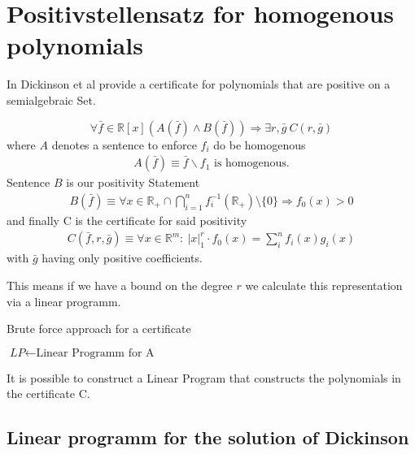 \documentclass[./main.tex]{subfiles}
\begin{document}
\section{Positivstellensatz for homogenous polynomials}
\label{secDick}
In \cite{dickinson2015extension} Dickinson et al  provide a certificate for polynomials that are positive on a semialgebraic Set.
\begin{thm}
\label{Dickinson}
\begin{equation}
\forall \bar{f} \in \mathbb{R}[x] \left( A(\bar{f}) \wedge B(\bar{f}) \right) \Rightarrow \exists r, \bar{g} \  C(r,\bar{g})
\end{equation}
where $A$ denotes a sentence to enforce $f_i$ do be homogenous
\begin{align*}
A(\bar{f}) \equiv \bar f \backslash f_1 \text{ is homogenous}.
\end{align*}
Sentence $B$ is our positivity Statement
\begin{align*}
B(\bar f ) \equiv \forall x \in \mathbb{R}_+\cap \bigcap_{i=1}^n f_i^{-1}(\mathbb R_+) \setminus \lbrace 0 \rbrace \Rightarrow f_0(x) >0 
\end{align*}
and finally C is the certificate for said positivity
\begin{align*}
C(\bar f ,r, \bar g) \equiv \forall x \in \mathbb{R}^m : \ \vert x \vert_1^r \cdot f_0(x) = \sum_i^n f_i(x)g_i(x) 
\end{align*}
with $\bar g$ having only positive coefficients.
\end{thm}


This means if we have a bound on the degree $r$ we calculate this representation via a linear programm.

\begin{algorithm}
\caption{Brute force approach for a certificate}\label{euclid}
\begin{algorithmic}[1]
\State $\textit{LP} \gets \text{Linear Programm for A}$\\
 {
}
\end{algorithmic}
\end{algorithm}


It is possible to construct a Linear Program that constructs the polynomials in the certificate C.
\subsection{Linear programm for the solution of Dickinson}
\end{document}
